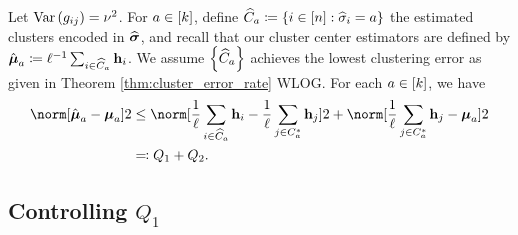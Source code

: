 Let $\operatorname*{Var}\left(g_{ij}\right)=\nu^{2}$. For $a\in\left[k\right]$,
define $\widehat{C}_{a}\coloneqq\left\{ i\in\left[n\right]:\widehat{\sigma}_{i}=a\right\} $
the estimated clusters encoded in $\widehat{\boldsymbol{\sigma}}$, and recall that our
cluster center estimators are defined by $\hat{\boldsymbol{\mu}}_{a}\coloneqq\ell^{-1}\sum_{i\in\widehat{C}_{a}}\mathbf{h}_{i}$.
We assume $\left\{ \widehat{C}_{a}\right\} $ achieves the lowest clustering
error as given in Theorem \ref{thm:cluster_error_rate} WLOG. For
each $a\in\left[k\right]$, we have 
\begin{align*}
\norm[\Meanhat_{a}-\Mean_{a}]2 & \le\norm[\frac{1}{\size}\sum_{i\in\clustest a}\h_{i}-\frac{1}{\size}\sum_{j\in\clustset a}\h_{j}]2+\norm[\frac{1}{\size}\sum_{j\in\clustset a}\h_{j}-\Mean_{a}]2\\
 & \eqqcolon Q_{1}+Q_{2}.
\end{align*}


\subsection{Controlling $Q_{1}$}

